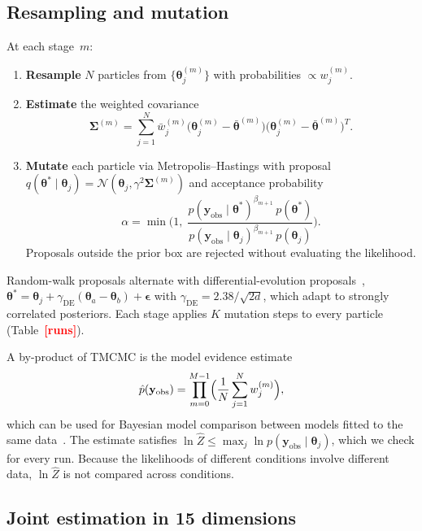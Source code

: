 \documentclass[pdflatex,sn-mathphys-ay,lineno]{sn-jnl}%
\newcommand{\btheta}{\boldsymbol{\theta}}
\newcommand{\yobs}{\mathbf{y}_{\mathrm{obs}}}
\newcommand{\TBD}[1]{\textcolor{red}{\textbf{[#1]}}}
\begin{document}
\subsection{Resampling and mutation}

At each stage~$m$:
\begin{enumerate}[nosep,leftmargin=*]
\item \textbf{Resample} $N$ particles from $\{\btheta_j^{(m)}\}$ with probabilities $\propto w_j^{(m)}$.
\item \textbf{Estimate} the weighted covariance
\begin{equation}
\boldsymbol{\Sigma}^{(m)}
= \sum_{j=1}^{N}\bar{w}_j^{(m)}
\bigl(\btheta_j^{(m)}-\bar{\btheta}^{(m)}\bigr)
\bigl(\btheta_j^{(m)}-\bar{\btheta}^{(m)}\bigr)^T.
\label{eq:cov}
\end{equation}
\item \textbf{Mutate} each particle via Metropolis--Hastings with proposal $q(\btheta^*\mid\btheta_j)=\mathcal{N}(\btheta_j,\gamma^2\boldsymbol{\Sigma}^{(m)})$ and acceptance probability
\begin{equation}
\alpha = \min\!\biggl(1,\;
\frac{p(\yobs\mid\btheta^*)^{\beta_{m+1}}\,p(\btheta^*)}
     {p(\yobs\mid\btheta_j)^{\beta_{m+1}}\,p(\btheta_j)}\biggr).
\label{eq:accept}
\end{equation}
Proposals outside the prior box are rejected without evaluating the likelihood.
\end{enumerate}
Random-walk proposals alternate with differential-evolution proposals~\citep{terBraak2006DEMC}, $\btheta^*=\btheta_j+\gamma_{\mathrm{DE}}(\btheta_a-\btheta_b)+\boldsymbol{\epsilon}$ with $\gamma_{\mathrm{DE}}=2.38/\sqrt{2d}$, which adapt to strongly correlated posteriors.
Each stage applies $K$ mutation steps to every particle (Table~\TBD{runs}).

A by-product of TMCMC is the model evidence estimate
\begin{equation}
\hat{p}(\yobs) = \prod_{m=0}^{M-1}\Bigl(\frac{1}{N}\sum_{j=1}^{N}w_j^{(m)}\Bigr),
\label{eq:evidence}
\end{equation}
which can be used for Bayesian model comparison between models fitted to the same data~\citep{KassRaftery1995BayesFactor}.
The estimate satisfies $\ln\hat{Z}\le\max_j\ln p(\yobs\mid\btheta_j)$, which we check for every run.
Because the likelihoods of different conditions involve different data, $\ln\hat{Z}$ is not compared across conditions.

\subsection{Joint estimation in 15 dimensions}
\end{document}
